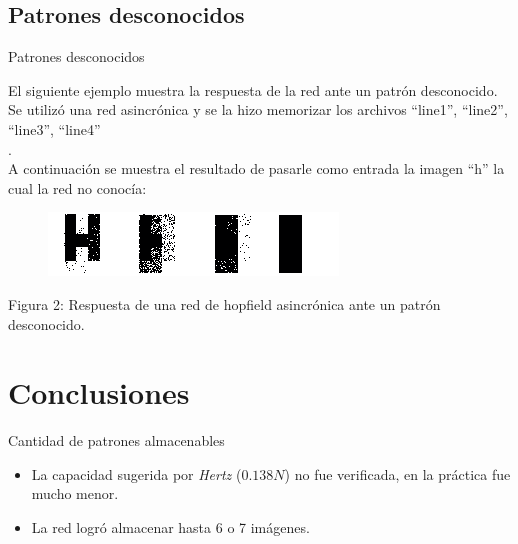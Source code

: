 \documentclass{beamer}
\begin{document}
\subsection{Patrones desconocidos}
\begin{frame}{Patrones desconocidos}

\par El siguiente ejemplo muestra la respuesta de la red ante un patrón desconocido. Se utilizó una red asincrónica y se la hizo memorizar los archivos ``line1'', ``line2'', ``line3'', ``line4''\\.\\
A continuación se muestra el resultado de pasarle como entrada la imagen ``h''  la cual la red no conocía: \\

\begin{figure}[H]
\begin{center}
\includegraphics[scale=0.60]{./images/hnoinvnopar.png}
\label{modelado}
\end{center}
\end{figure}

\begin{center}
\par Figura 2: Respuesta de una red de hopfield asincrónica ante un patrón desconocido.
\end{center}
\end{frame}

\section{Conclusiones}

\begin{frame}{Cantidad de patrones almacenables}

\begin{itemize}
\item \Large La capacidad sugerida por \textit{Hertz} ($0.138N$) no fue verificada, en la práctica fue mucho menor.
\item La red logró almacenar hasta 6 o 7 imágenes.
\end{itemize}

\end{frame}
\end{document}
